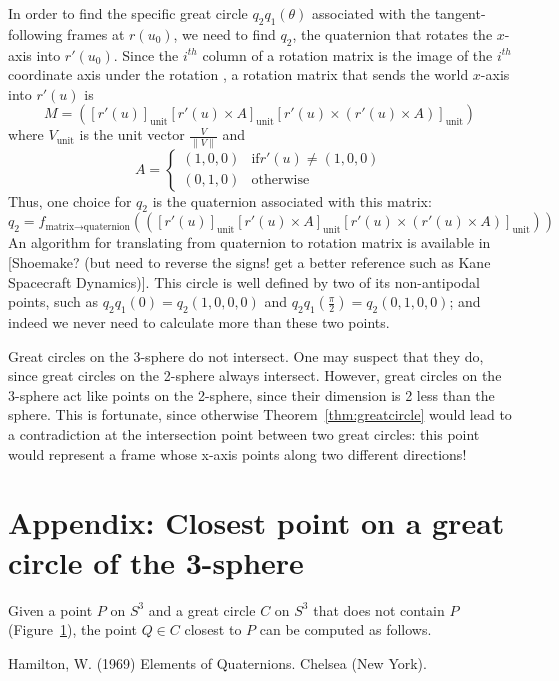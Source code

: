 In order to find the specific great circle $q_2 q_1(\theta)$ associated
with the tangent-following frames at $r(u_0)$,
we need to find $q_2$, the quaternion that rotates the $x$-axis into $r'(u_0)$.
Since the $i^{th}$ column of a rotation matrix is the image of the $i^{th}$
coordinate axis under the rotation \cite{foleyVanDam},
a rotation matrix that sends the world $x$-axis into $r'(u)$ is
%
\begin{equation}
M = ([r'(u)]_{\mbox{unit}} [r'(u) \times A]_{\mbox{unit}} 
	[r'(u) \times (r'(u) \times A)]_{\mbox{unit}} )
\end{equation}
%
where $V_{\mbox{unit}}$ is the unit vector $\frac{V}{\|V\|}$
and
\[
	A = \left\{ \begin{array}{ll}
		(1,0,0)	& \mbox{if} r'(u) \neq (1,0,0) \\
		(0,1,0) & \mbox{otherwise}
		\end{array} \right.
\]
Thus, one choice for $q_2$ is the quaternion associated with this matrix:
%
\begin{equation}
	q_2 = f_{\mbox{matrix} \rightarrow \mbox{quaternion}} 
	(([r'(u)]_{\mbox{unit}} [r'(u) \times A]_{\mbox{unit}} 
	 [r'(u) \times (r'(u) \times A)]_{\mbox{unit}} ))
\end{equation}
%
An algorithm for translating from quaternion to rotation matrix is available
in [Shoemake? \cite{} (but need to reverse the signs! get a better reference
such as Kane Spacecraft Dynamics)].
This circle is well defined by two of its non-antipodal points,
such as $q_2 q_1(0) = q_2 (1,0,0,0)$ and $q_2 q_1(\frac{\pi}{2})
= q_2 (0,1,0,0)$;
and indeed we never need to calculate more than these two points.

\begin{rmk}
Great circles on the 3-sphere do not intersect.
One may suspect that they do, since great circles on the 2-sphere always
intersect.  However, great circles on the 3-sphere act like points on the
2-sphere, since their dimension is 2 less than the sphere.
This is fortunate, since otherwise Theorem~\ref{thm:greatcircle}
would lead to a contradiction at the intersection point between two
great circles: this point would represent a frame whose x-axis points along
two different directions!
\end{rmk}

\section{Appendix: Closest point on a great circle of the 3-sphere}

Given a point $P$ on $S^3$ and a great circle $C$ on $S^3$ that does not contain
$P$ (Figure~\ref{}), the point $Q \in C$ closest to $P$ can be computed
as follows.


\begin{thebibliography}{99}

Hamilton, W. (1969)
Elements of Quaternions.
Chelsea (New York).

\end{thebibliography}


